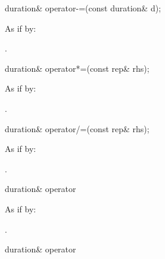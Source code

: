 %
%
\begin{itemdecl}
duration& operator-=(const duration& d);
\end{itemdecl}

\begin{itemdescr}
\pnum
\effects As if by: 

\pnum
\returns {}.
\end{itemdescr}

%
%
\begin{itemdecl}
duration& operator*=(const rep& rhs);
\end{itemdecl}

\begin{itemdescr}
\pnum
\effects As if by: 

\pnum
\returns {}.
\end{itemdescr}

%
%
\begin{itemdecl}
duration& operator/=(const rep& rhs);
\end{itemdecl}

\begin{itemdescr}
\pnum
\effects As if by: 

\pnum
\returns {}.
\end{itemdescr}

%
%
\begin{itemdecl}
duration& operator%
\end{itemdecl}

\begin{itemdescr}
\pnum
\effects As if by: 

\pnum
\returns {}.
\end{itemdescr}

%
%
\begin{itemdecl}
duration& operator%
\end{itemdecl}

